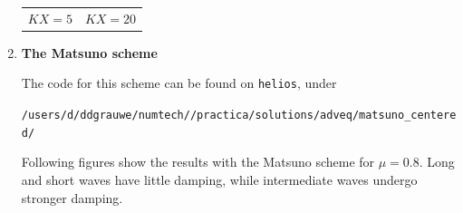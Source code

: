 \documentclass[a4paper,fleqn]{article}
\begin{document}
\begin{enumerate}
\begin{center}
\begin{tabular}{cc}
				$KX=5$	&	$KX=20$
			\end{tabular}\hspace*{-50mm}
		\end{center}\vspace{2ex}
	\item \textbf{The Matsuno scheme}
		\par
		The code for this scheme can be found on \texttt{helios}, under
		\par
		\texttt{/users/d/ddgrauwe/numtech/\unskip/practica/solutions/adveq/matsuno\_centered/}
		\par
		Following figures show the results with the Matsuno scheme for $\mu=0.8$. Long and short waves have little damping, while intermediate waves undergo stronger damping.
		\par
		\begin{center}
			\hspace*{-50mm}
			\begin{tabular}{ccc}

\end{tabular}
\end{center}
\end{enumerate}
\end{document}
